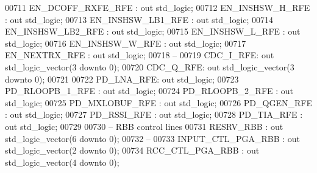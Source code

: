 \begin{DoxyCode}
00711         EN\_DCOFF\_RXFE\_RFE   : \textcolor{keywordflow}{out} \textcolor{comment}{std\_logic};
00712         EN\_INSHSW\_H\_RFE     : \textcolor{keywordflow}{out} \textcolor{comment}{std\_logic};
00713         EN\_INSHSW\_LB1\_RFE   : \textcolor{keywordflow}{out} \textcolor{comment}{std\_logic};
00714         EN\_INSHSW\_LB2\_RFE   : \textcolor{keywordflow}{out} \textcolor{comment}{std\_logic};
00715         EN\_INSHSW\_L\_RFE     : \textcolor{keywordflow}{out} \textcolor{comment}{std\_logic};
00716         EN\_INSHSW\_W\_RFE     : \textcolor{keywordflow}{out} \textcolor{comment}{std\_logic};
00717         EN\_NEXTRX\_RFE           : \textcolor{keywordflow}{out} \textcolor{comment}{std\_logic};
00718 \textcolor{keyword}{        --}
00719         CDC\_I\_RFE:  \textcolor{keywordflow}{out} \textcolor{comment}{std\_logic\_vector}(\textcolor{vhdllogic}{}\textcolor{vhdllogic}{3} \textcolor{keywordflow}{downto} \textcolor{vhdllogic}{}\textcolor{vhdllogic}{0});
00720         CDC\_Q\_RFE:  \textcolor{keywordflow}{out} \textcolor{comment}{std\_logic\_vector}(\textcolor{vhdllogic}{}\textcolor{vhdllogic}{3} \textcolor{keywordflow}{downto} \textcolor{vhdllogic}{}\textcolor{vhdllogic}{0});
00721         
00722         PD\_LNA\_RFE:     \textcolor{keywordflow}{out} \textcolor{comment}{std\_logic};
00723         PD\_RLOOPB\_1\_RFE     : \textcolor{keywordflow}{out} \textcolor{comment}{std\_logic};
00724         PD\_RLOOPB\_2\_RFE     : \textcolor{keywordflow}{out} \textcolor{comment}{std\_logic};
00725         PD\_MXLOBUF\_RFE      : \textcolor{keywordflow}{out} \textcolor{comment}{std\_logic};
00726         PD\_QGEN\_RFE             : \textcolor{keywordflow}{out} \textcolor{comment}{std\_logic};
00727         PD\_RSSI\_RFE             : \textcolor{keywordflow}{out} \textcolor{comment}{std\_logic};
00728         PD\_TIA\_RFE              : \textcolor{keywordflow}{out} \textcolor{comment}{std\_logic};
00729 
00730 \textcolor{keyword}{        -- RBB control lines }
00731         RESRV\_RBB   : \textcolor{keywordflow}{out} \textcolor{comment}{std\_logic\_vector}(\textcolor{vhdllogic}{}\textcolor{vhdllogic}{6} \textcolor{keywordflow}{downto} \textcolor{vhdllogic}{}\textcolor{vhdllogic}{0});
00732 \textcolor{keyword}{        --}
00733         INPUT\_CTL\_PGA\_RBB   : \textcolor{keywordflow}{out} \textcolor{comment}{std\_logic\_vector}(\textcolor{vhdllogic}{}\textcolor{vhdllogic}{2} \textcolor{keywordflow}{downto} \textcolor{vhdllogic}{}\textcolor{vhdllogic}{0});
00734         RCC\_CTL\_PGA\_RBB     : \textcolor{keywordflow}{out} \textcolor{comment}{std\_logic\_vector}(\textcolor{vhdllogic}{}\textcolor{vhdllogic}{4} \textcolor{keywordflow}{downto} \textcolor{vhdllogic}{}\textcolor{vhdllogic}{0});

\end{DoxyCode}
